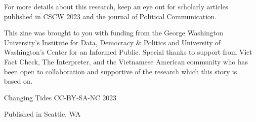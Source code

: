 \documentclass[
]{book}
\begin{document}
For more details about this research, keep an eye out for scholarly articles published in CSCW 2023 and the journal of Political Communication.

This zine was brought to you with funding from the George Washington University's Institute for Data, Democracy \& Politics and University of Washington's Center for an Informed Public. Special thanks to support from Viet Fact Check, The Interpreter, and the Vietnamese American community who has been open to collaboration and supportive of the research which this story is based on.

Changing Tides CC-BY-SA-NC 2023

Published in Seattle, WA

  
\end{document}
